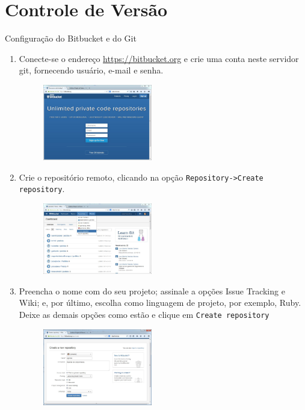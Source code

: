 \section{Controle de Versão}
\begin{frame}{Configuração do Bitbucket e do Git}
  \begin{enumerate}
    \item Conecte-se o endereço \url{https://bitbucket.org} e crie uma conta neste servidor git,
      fornecendo usuário, e-mail e senha.
      \begin{figure}[h!]
	\centering
	\includegraphics[width=0.45\textwidth]{devops/imagens/bitbucket-1.jpg}
      \end{figure}
      
     \framebreak
     \item Crie o repositório remoto, clicando na opção \verb!Repository->Create repository!.
      \begin{figure}[h!]
	\centering
	\includegraphics[width=0.45\textwidth]{devops/imagens/bitbucket-2.jpg}
      \end{figure}
      
     \framebreak
     \item Preencha o nome com \alert{do seu projeto}; assinale a opções \alert{Issue Tracking} e 
      \alert{Wiki}; e, por último, escolha como linguagem de projeto, por exemplo, \alert{Ruby}. Deixe
      as demais opções como estão e clique em \verb!Create repository!
      \begin{figure}[h!]
	\centering
	\includegraphics[width=0.45\textwidth]{devops/imagens/bitbucket-3.jpg}
      \end{figure}
      

\end{enumerate}
\end{frame}

